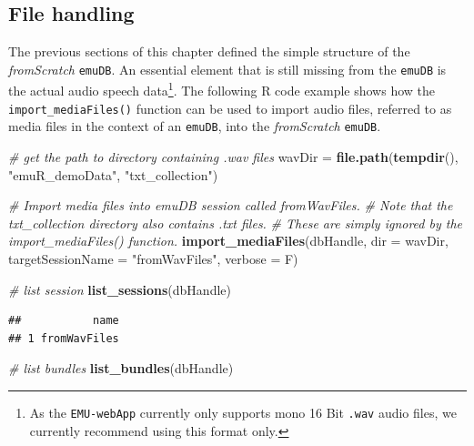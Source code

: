 \documentclass[]{book}
\newenvironment{Shaded}{\begin{snugshade}}{\end{snugshade}}
\newcommand{\CommentTok}[1]{\textcolor[rgb]{0.56,0.35,0.01}{\textit{#1}}}
\newcommand{\DataTypeTok}[1]{\textcolor[rgb]{0.13,0.29,0.53}{#1}}
\newcommand{\KeywordTok}[1]{\textcolor[rgb]{0.13,0.29,0.53}{\textbf{#1}}}
\newcommand{\NormalTok}[1]{#1}
\newcommand{\StringTok}[1]{\textcolor[rgb]{0.31,0.60,0.02}{#1}}
\let\rmarkdownfootnote\footnote%
\def\footnote{\protect\rmarkdownfootnote}
\begin{document}
\hypertarget{file-handling}{%
\subsection{File handling}\label{file-handling}}

The previous sections of this chapter defined the simple structure of the \emph{fromScratch} \texttt{emuDB}. An essential element that is still missing from the \texttt{emuDB} is the actual audio speech data\footnote{As the \texttt{EMU-webApp} currently only supports mono 16 Bit \texttt{.wav} audio files, we currently recommend using this format only.}. The following R code example shows how the \texttt{import\_mediaFiles()} function can be used to import audio files, referred to as media files in the context of an \texttt{emuDB}, into the \emph{fromScratch} \texttt{emuDB}.

\begin{Shaded}
\begin{Highlighting}[]
\CommentTok{# get the path to directory containing .wav files}
\NormalTok{wavDir =}\StringTok{ }\KeywordTok{file.path}\NormalTok{(}\KeywordTok{tempdir}\NormalTok{(), }\StringTok{"emuR_demoData"}\NormalTok{, }\StringTok{"txt_collection"}\NormalTok{)}

\CommentTok{# Import media files into emuDB session called fromWavFiles.}
\CommentTok{# Note that the txt_collection directory also contains .txt files.}
\CommentTok{# These are simply ignored by the import_mediaFiles() function.}
\KeywordTok{import_mediaFiles}\NormalTok{(dbHandle,}
                  \DataTypeTok{dir =}\NormalTok{ wavDir,}
                  \DataTypeTok{targetSessionName =} \StringTok{"fromWavFiles"}\NormalTok{,}
                  \DataTypeTok{verbose =}\NormalTok{ F)}

\CommentTok{# list session}
\KeywordTok{list_sessions}\NormalTok{(dbHandle)}
\end{Highlighting}
\end{Shaded}

\begin{verbatim}
##           name
## 1 fromWavFiles
\end{verbatim}

\begin{Shaded}
\begin{Highlighting}[]
\CommentTok{# list bundles}
\KeywordTok{list_bundles}\NormalTok{(dbHandle)}
\end{Highlighting}
\end{Shaded}
\end{document}
